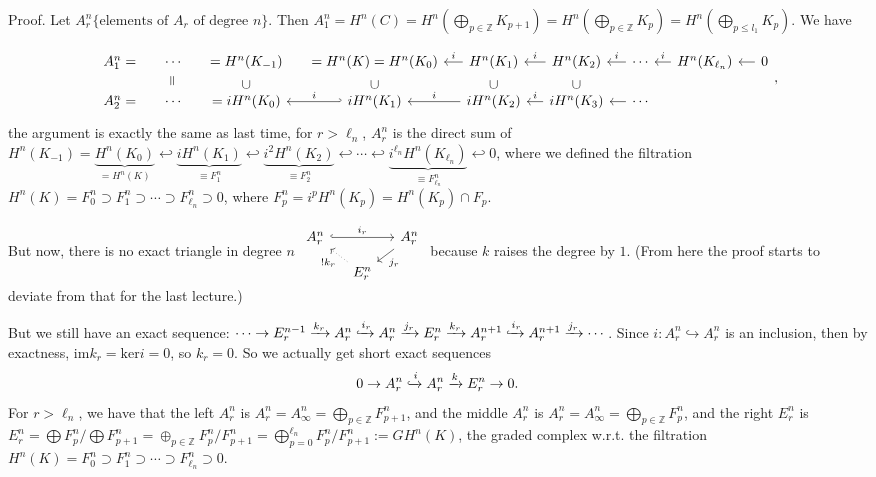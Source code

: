 \documentclass{article}
\newcommand{\verteq}{\rotatebox{90}{$\,=$}}
\theoremstyle{mystyle}
\theoremstyle{remark}
\numberwithin{equation}{section}
\begin{document}
\noindent Proof. Let $A^n_r \{\text{elements of }A_r\text{ of degree }n\}$. Then $A^n_1 = H^n(C) = H^n(\bigoplus_{p\in \mathbb{Z}}K_{p+1}) = H^n(\bigoplus_{p\in \mathbb{Z}}K_p)=
H^n(\bigoplus_{p\leq l_1}K_p)$. We have 

$$
\begin{tikzcd}[row sep = -0.1cm,column sep = small]
A^n_1= & \cdots &=  H^n(K_{-1})& = H^n(K)=H^n(K_0)&\ar[l,"i"'] H^n(K_1) &\ar[l,"i"'] H^n(K_2) & \ar[l,"i"'] \cdots & \ar[l,"i"'] H^n(K_{\ell_n}) & \ar[l] 0\\
 &\verteq& \cup& \cup & \cup  &\cup  \\
A^n_2= &  \cdots &= iH^n(K_0)&\ar[l,hook', "i"']  iH^n(K_1) &\ar[l,"i"'] iH^n(K_2) & \ar[l,"i"'] iH^n(K_3) & \ar[l]\cdots
 \end{tikzcd},
$$
the argument is exactly the same as last time, for $r>\ell_n$, $A_r^n$ is the direct sum of $H^n(K_{-1}) = \underbrace{H^n(K_0)}_{=H^n(K)}\hookleftarrow \underbrace{iH^n(K_1)}_{\equiv F_1^n}\hookleftarrow \underbrace{i^2H^n(K_2)}_{\equiv F_2^n}\hookleftarrow \cdots \hookleftarrow \underbrace{i^{\ell_n}H^n(K_{\ell_n})}_{\equiv F^n_{\ell_n}}\hookleftarrow{0}$, where we defined the filtration $H^n(K)= F_0^n\supset F_1^n\supset \cdots \supset F_{\ell_n}^n\supset 0$, where $F^n_p = i^pH^n(K_p)
=H^n(K_p) \cap F_p$. 


But now, there is no exact triangle in degree $n$
$
\begin{tikzcd}[column sep = small, row sep = small]
A_r^n\ar[rr,hook,"i_r"] &&A^n_r \ar[dl,"j_r"]\\
&E^n_r\ar[ul,dotted,"!k_r"]&
\end{tikzcd}
$
because $k$ raises the degree by $1$. 
(From here the proof starts to deviate from that for the last lecture.)

But we still have an exact sequence: $\cdots \rightarrow E_r^{n-1}\xrightarrow{k_r} A^n_r\xhookrightarrow{i_r} A^n_r\xrightarrow{j_r} E^n_r \xrightarrow{k_r} A_r^{n+1}\xhookrightarrow{i_r} A_r^{n+1}\xrightarrow{j_r} \cdots$. Since $i\colon A^n_r\hookrightarrow A^n_r$ is an inclusion, then by exactness, $\mathrm{im}k_r = \mathrm{ker}i = 0$, so $k_r=0$. So we actually get short exact sequences 
$$0\rightarrow A^n_r\xhookrightarrow{i} A^n_r \xrightarrow{k} E^n_r \rightarrow 0.$$
For $r>\ell_n$, we have that the left $A^n_r$ is $A^n_r = A^n_\infty = \bigoplus_{p\in \mathbb{Z}}F^n_{p+1}$, and the middle $A^n_r$ is $A^n_r = A^n_\infty = \bigoplus_{p\in \mathbb{Z}}F^n_p$, and the right $E^n_r$ is $E^n_r = \bigoplus F^n_p/\bigoplus F^n_{p+1} = \oplus_{p\in \mathbb{Z}} F^n_p/F^n_{p+1} = \bigoplus_{p=0}^{\ell_n} F^n_p/F^n_{p+1}:= GH^n(K)$, the graded complex w.r.t. the filtration $H^n(K)=F_0^n\supset F_1^n\supset \cdots \supset F_{\ell_n}^n \supset 0$.  
\end{document}
